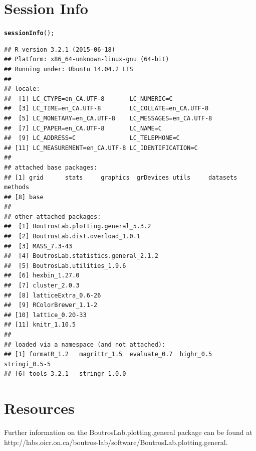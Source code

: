\documentclass[letterpaper]{report}\usepackage[]{graphicx}\usepackage[]{color}
\makeatletter
\newcommand{\hlstd}[1]{\textcolor[rgb]{0.345,0.345,0.345}{#1}}%
\newcommand{\hlkwd}[1]{\textcolor[rgb]{0.737,0.353,0.396}{\textbf{#1}}}%
\newenvironment{kframe}{%
 \def\at@end@of@kframe{}%
 \ifinner\ifhmode%
  \def\at@end@of@kframe{\end{minipage}}%
  \begin{minipage}{\columnwidth}%
 \fi\fi%
 \def\FrameCommand##1{\hskip\@totalleftmargin \hskip-\fboxsep
 \colorbox{shadecolor}{##1}\hskip-\fboxsep
     \hskip-\linewidth \hskip-\@totalleftmargin \hskip\columnwidth}%
 \MakeFramed {\advance\hsize-\width
   \@totalleftmargin\z@ \linewidth\hsize
   \@setminipage}}%
 {\par\unskip\endMakeFramed%
 \at@end@of@kframe}
\newenvironment{knitrout}{}{} %
\makeatother
\begin{document}
\section{Session Info}
\begin{knitrout}
\color{fgcolor}\begin{kframe}
\begin{alltt}
\hlkwd{sessionInfo}\hlstd{();}
\end{alltt}
\begin{verbatim}
## R version 3.2.1 (2015-06-18)
## Platform: x86_64-unknown-linux-gnu (64-bit)
## Running under: Ubuntu 14.04.2 LTS
## 
## locale:
##  [1] LC_CTYPE=en_CA.UTF-8       LC_NUMERIC=C              
##  [3] LC_TIME=en_CA.UTF-8        LC_COLLATE=en_CA.UTF-8    
##  [5] LC_MONETARY=en_CA.UTF-8    LC_MESSAGES=en_CA.UTF-8   
##  [7] LC_PAPER=en_CA.UTF-8       LC_NAME=C                 
##  [9] LC_ADDRESS=C               LC_TELEPHONE=C            
## [11] LC_MEASUREMENT=en_CA.UTF-8 LC_IDENTIFICATION=C       
## 
## attached base packages:
## [1] grid      stats     graphics  grDevices utils     datasets  methods  
## [8] base     
## 
## other attached packages:
##  [1] BoutrosLab.plotting.general_5.3.2  
##  [2] BoutrosLab.dist.overload_1.0.1     
##  [3] MASS_7.3-43                        
##  [4] BoutrosLab.statistics.general_2.1.2
##  [5] BoutrosLab.utilities_1.9.6         
##  [6] hexbin_1.27.0                      
##  [7] cluster_2.0.3                      
##  [8] latticeExtra_0.6-26                
##  [9] RColorBrewer_1.1-2                 
## [10] lattice_0.20-33                    
## [11] knitr_1.10.5                       
## 
## loaded via a namespace (and not attached):
## [1] formatR_1.2   magrittr_1.5  evaluate_0.7  highr_0.5     stringi_0.5-5
## [6] tools_3.2.1   stringr_1.0.0
\end{verbatim}
\end{kframe}
\end{knitrout}

\section{Resources}
Further information on the BoutrosLab.plotting.general package can be found at  http://labs.oicr.on.ca/boutros-lab/software/BoutrosLab.plotting.general.
\end{document}
